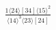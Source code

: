 \documentclass[varwidth, border=5pt]{standalone}
\begin{document}
\begin{my}
$\begin{gathered}
\scriptscriptstyle\frac{1⟨24⟩[34]⟨15⟩^2}{⟨14⟩^3⟨23⟩[24]}
\end{gathered}$
\end{my}
\end{document}
